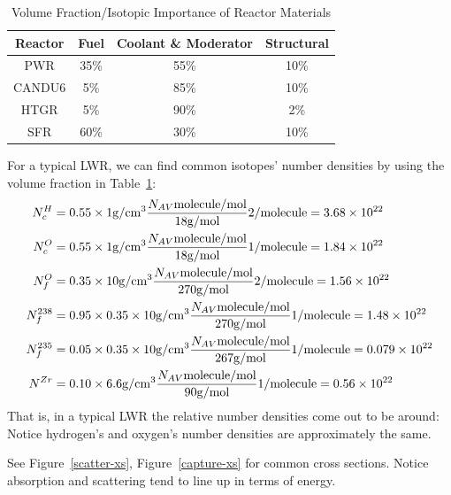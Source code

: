 \documentclass{school-22.211-notes}
\begin{document}
\begin{table}
  \centering
  \begin{tabular}{|c|c|c|c|} \hline
    Reactor & Fuel & Coolant \& Moderator & Structural  \\ \hline \hline
    PWR & 35\% & 55\% & 10\% \\ \hline
    CANDU6 & 5\% & 85\% & 10\%  \\ \hline
    HTGR & 5\% & 90\% & 2\% \\ \hline
    SFR & 60\% & 30\% & 10\% \\ \hline
  \end{tabular}
  \caption{Volume Fraction/Isotopic Importance of Reactor Materials} \label{volume-fraction}
\end{table}
For a typical LWR, we can find common isotopes' number densities by using the volume fraction in Table~\ref{volume-fraction}: 
\begin{align}
N^H_c &= 0.55 \times 1 \mathrm{g}/\mathrm{cm}^3 \frac{N_{AV} \mathrm{molecule}/\mathrm{mol}}{18 \mathrm{g}/\mathrm{mol}} 2/\mathrm{molecule}  = 3.68 \times 10^{22} \\
N^O_c &= 0.55 \times 1 \mathrm{g}/\mathrm{cm}^3 \frac{N_{AV} \mathrm{molecule}/\mathrm{mol}}{18 \mathrm{g}/\mathrm{mol}} 1/\mathrm{molecule}  = 1.84 \times 10^{22} \\
N^O_f &= 0.35 \times 10 \mathrm{g}/\mathrm{cm}^3 \frac{N_{AV} \mathrm{molecule}/\mathrm{mol}}{270 \mathrm{g}/\mathrm{mol}} 2/\mathrm{molecule}  = 1.56 \times 10^{22} \\
N^{238}_f &= 0.95 \times 0.35 \times 10 \mathrm{g}/\mathrm{cm}^3 \frac{N_{AV} \mathrm{molecule}/\mathrm{mol}}{270 \mathrm{g}/\mathrm{mol}} 1/\mathrm{molecule}  = 1.48 \times 10^{22} \\
N^{235}_f &= 0.05 \times 0.35 \times 10 \mathrm{g}/\mathrm{cm}^3 \frac{N_{AV} \mathrm{molecule}/\mathrm{mol}}{267 \mathrm{g}/\mathrm{mol}} 1/\mathrm{molecule}  = 0.079 \times 10^{22} \\
N^{Zr} &= 0.10 \times 6.6 \mathrm{g}/\mathrm{cm}^3 \frac{N_{AV} \mathrm{molecule}/\mathrm{mol}}{90 \mathrm{g}/\mathrm{mol}} 1/\mathrm{molecule}  = 0.56 \times 10^{22} 
\end{align}
That is, in a typical LWR the relative number densities come out to be around: 
Notice hydrogen's and oxygen's number densities are approximately the same. 

See Figure~\ref{scatter-xs}, Figure~\ref{capture-xs} for common cross sections. Notice absorption and scattering tend to line up in terms of energy. 
\end{document}
